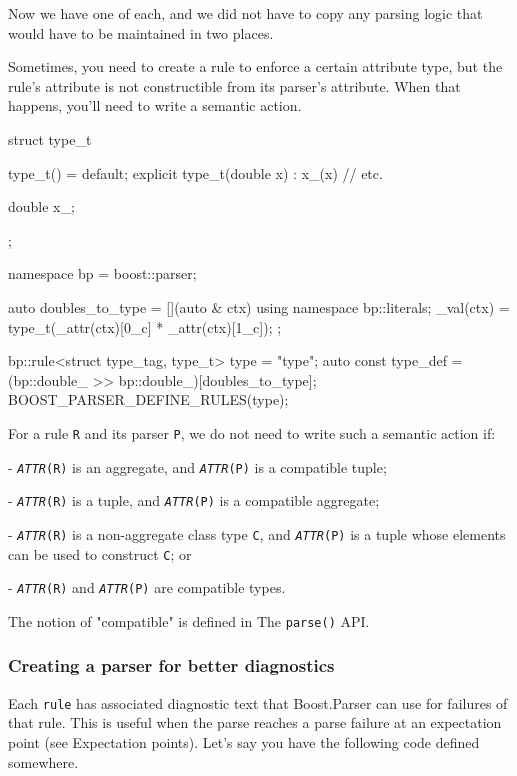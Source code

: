 Now we have one of each, and we did not have to copy any parsing logic that would have to be maintained in two places.

Sometimes, you need to create a rule to enforce a certain attribute type, but the rule's attribute is not constructible from its parser's attribute. When that happens, you'll need to write a semantic action.

\begin{code}
struct type_t
{
    type_t() = default;
    explicit type_t(double x) : x_(x) {}
    // etc.

    double x_;
};

namespace bp = boost::parser;

auto doubles_to_type = [](auto & ctx) {
    using namespace bp::literals;
    _val(ctx) = type_t(_attr(ctx)[0_c] * _attr(ctx)[1_c]);
};

bp::rule<struct type_tag, type_t> type = "type";
auto const type_def = (bp::double_ >> bp::double_)[doubles_to_type];
BOOST_PARSER_DEFINE_RULES(type);
\end{code}

For a rule \texttt{R} and its parser \texttt{P}, we do not need to write such a semantic action if:

- \emph{\texttt{ATTR}}\texttt{(R)} is an aggregate, and \emph{\texttt{ATTR}}\texttt{(P)} is a compatible tuple;

- \emph{\texttt{ATTR}}\texttt{(R)} is a tuple, and \emph{\texttt{ATTR}}\texttt{(P)} is a compatible aggregate;

- \emph{\texttt{ATTR}}\texttt{(R)} is a non-aggregate class type \texttt{C}, and \emph{\texttt{ATTR}}\texttt{(P)} is a tuple whose elements can be used to construct \texttt{C}; or

- \emph{\texttt{ATTR}}\texttt{(R)} and \emph{\texttt{ATTR}}\texttt{(P)} are compatible types.

The notion of "compatible" is defined in The \texttt{parse()} API.

\subsubsection{Creating a parser for better diagnostics}

Each \texttt{rule} has associated diagnostic text that Boost.Parser can use for failures of that rule. This is useful when the parse reaches a parse failure at an expectation point (see Expectation points). Let's say you have the following code defined somewhere.

